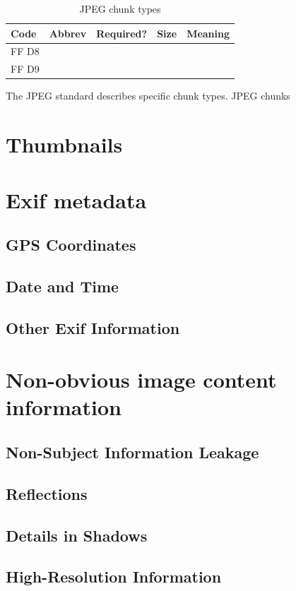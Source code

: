 \begin{table}
\begin{tabular}{lllll}
Code & Abbrev & Required? & Size & Meaning \\
\hline
FF D8 & \\
FF D9 & \\
\end{tabular}
\caption{JPEG chunk types}\label{tab:jpeg-format}
\end{table}
The JPEG standard describes specific chunk types. JPEG chunks 




\section{Thumbnails}

\section{Exif metadata}\label{sec:exif}
\subsection{GPS Coordinates}
\subsection{Date and Time}
\subsection{Other Exif Information}

\section{Non-obvious image content information}
\subsection{Non-Subject Information Leakage}
\subsection{Reflections}
\subsection{Details in Shadows}
\subsection{High-Resolution Information}


